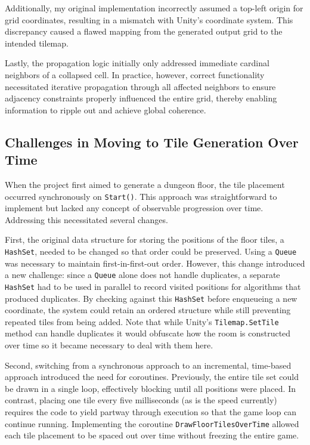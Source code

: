 \documentclass[a4paper, 12pt, one column, aas_macros]{article}
\begin{document}
Additionally, my original implementation incorrectly assumed a top-left origin for grid coordinates, resulting in a mismatch with Unity's coordinate system. This discrepancy caused a flawed mapping from the generated output grid to the intended tilemap.

Lastly, the propagation logic initially only addressed immediate cardinal neighbors of a collapsed cell. In practice, however, correct functionality necessitated iterative propagation through all affected neighbors to ensure adjacency constraints properly influenced the entire grid, thereby enabling information to ripple out and achieve global coherence.

\subsection{Challenges in Moving to Tile Generation Over Time}
When the project first aimed to generate a dungeon floor, the tile placement occurred synchronously on \texttt{Start()}. This approach was straightforward to implement but lacked any concept of observable progression over time. Addressing this necessitated several changes. 

First, the original data structure for storing the positions of the floor tiles, a \texttt{HashSet}, needed to be changed so that order could be preserved. Using a \texttt{Queue} was necessary to maintain first-in-first-out order. However, this change introduced a new challenge: since a \texttt{Queue} alone does not handle duplicates, a separate \texttt{HashSet} had to be used in parallel to record visited positions for algorithms that produced duplicates. By checking against this \texttt{HashSet} before enqueueing a new coordinate, the system could retain an ordered structure while still preventing repeated tiles from being added. Note that while Unity's \texttt{Tilemap.SetTile} method can handle duplicates it would obfuscate how the room is constructed over time so it became necessary to deal with them here.

Second, switching from a synchronous approach to an incremental, time-based approach introduced the need for coroutines. Previously, the entire tile set could be drawn in a single loop, effectively blocking until all positions were placed. In contrast, placing one tile every five milliseconds (as is the speed currently) requires the code to yield partway through execution so that the game loop can continue running. Implementing the coroutine \texttt{DrawFloorTilesOverTime} allowed each tile placement to be spaced out over time without freezing the entire game.
\end{document}
